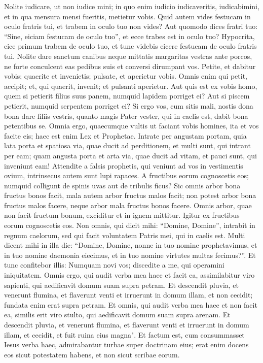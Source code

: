 \begin{biblechapter}  
\verse Nolite iudicare, ut non iudice mini; 
\verse in quo enim iudicio iudicaveritis, iudicabimini, et in qua mensura mensi fueritis, metietur vobis. 
\verse Quid autem vides festucam in oculo fratris tui, et trabem in oculo tuo non vides? 
\verse Aut quomodo dices fratri tuo: “Sine, eiciam festucam de oculo tuo”, et ecce trabes est in oculo tuo? 
\verse Hypocrita, eice primum trabem de oculo tuo, et tunc videbis eicere festucam de oculo fratris tui. 
\verse Nolite dare sanctum canibus neque mittatis margaritas vestras ante porcos, ne forte conculcent eas pedibus suis et conversi dirumpant vos. 
\verse Petite, et dabitur vobis; quaerite et invenietis; pulsate, et aperietur vobis. 
\verse Omnis enim qui petit, accipit; et, qui quaerit, invenit; et pulsanti aperietur. 
\verse Aut quis est ex vobis homo, quem si petierit filius suus panem, numquid lapidem porriget ei? 
\verse Aut si piscem petierit, numquid serpentem porriget ei? 
\verse Si ergo vos, cum sitis mali, nostis dona bona dare filiis vestris, quanto magis Pater vester, qui in caelis est, dabit bona petentibus se. 
\verse Omnia ergo, quaecumque vultis ut faciant vobis homines, ita et vos facite eis; haec est enim Lex et Prophetae. 
\verse Intrate per angustam portam, quia lata porta et spatiosa via, quae ducit ad perditionem, et multi sunt, qui intrant per eam; 
\verse quam angusta porta et arta via, quae ducit ad vitam, et pauci sunt, qui inveniunt eam! 
\verse Attendite a falsis prophetis, qui veniunt ad vos in vestimentis ovium, intrinsecus autem sunt lupi rapaces. 
\verse A fructibus eorum cognoscetis eos; numquid colligunt de spinis uvas aut de tribulis ficus? 
\verse Sic omnis arbor bona fructus bonos facit, mala autem arbor fructus malos facit; 
\verse non potest arbor bona fructus malos facere, neque arbor mala fructus bonos facere.  
\verse Omnis arbor, quae non facit fructum bonum, exciditur et in ignem mittitur.  
\verse Igitur ex fructibus eorum cognoscetis eos. 
\verse Non omnis, qui dicit mihi: “Domine, Domine”, intrabit in regnum caelorum, sed qui facit voluntatem Patris mei, qui in caelis est. 
\verse Multi dicent mihi in illa die: “Domine, Domine, nonne in tuo nomine prophetavimus, et in tuo nomine daemonia eiecimus, et in tuo nomine virtutes multas fecimus?”. 
\verse Et tunc confitebor illis: Numquam novi vos; discedite a me, qui operamini iniquitatem. 
\verse Omnis ergo, qui audit verba mea haec et facit ea, assimilabitur viro sapienti, qui aedificavit domum suam supra petram. 
\verse Et descendit pluvia, et venerunt flumina, et flaverunt venti et irruerunt in domum illam, et non cecidit; fundata enim erat supra petram. 
\verse Et omnis, qui audit verba mea haec et non facit ea, similis erit viro stulto, qui aedificavit domum suam supra arenam. 
\verse Et descendit pluvia, et venerunt flumina, et flaverunt venti et irruerunt in domum illam, et cecidit, et fuit ruina eius magna". 
\verse Et factum est, cum consummasset Iesus verba haec, admirabantur turbae super doctrinam eius; 
\verse erat enim docens eos sicut potestatem habens, et non sicut scribae eorum. 
\end{biblechapter}

